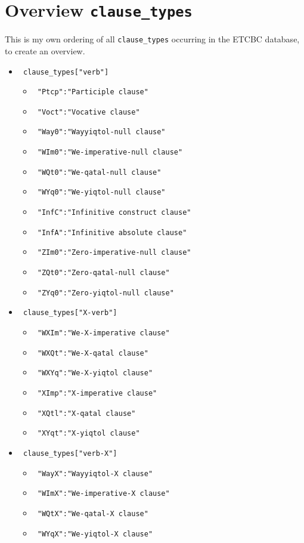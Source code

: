 \documentclass{report}
\newcommand{\mi}[1]{\lstinline{#1}}
\begin{document}
\section{Overview \mi{clause_types}}
This is my own ordering of all \mi{clause_types} occurring in the ETCBC database, to create an overview.

\begin{itemize}
\item \mi{ clause_types["verb"]}
\begin{itemize}
\item \mi{ "Ptcp":"Participle clause"}
\item \mi{ "Voct":"Vocative clause"}
\item \mi{ "Way0":"Wayyiqtol-null clause"}
\item \mi{ "WIm0":"We-imperative-null clause"}
\item \mi{ "WQt0":"We-qatal-null clause"}
\item \mi{ "WYq0":"We-yiqtol-null clause"}
\item \mi{ "InfC":"Infinitive construct clause"}
\item \mi{ "InfA":"Infinitive absolute clause"}
\item \mi{ "ZIm0":"Zero-imperative-null clause"}
\item \mi{ "ZQt0":"Zero-qatal-null clause"}
\item \mi{ "ZYq0":"Zero-yiqtol-null clause"}
\end{itemize}
\item \mi{ clause_types["X-verb"]}
\begin{itemize}
\item \mi{ "WXIm":"We-X-imperative clause"}
\item \mi{ "WXQt":"We-X-qatal clause"}
\item \mi{ "WXYq":"We-X-yiqtol clause"}
\item \mi{ "XImp":"X-imperative clause"}
\item \mi{ "XQtl":"X-qatal clause"}
\item \mi{ "XYqt":"X-yiqtol clause"}
\end{itemize}
\item \mi{ clause_types["verb-X"]}
\begin{itemize}
\item \mi{ "WayX":"Wayyiqtol-X clause"}
\item \mi{ "WImX":"We-imperative-X clause"}
\item \mi{ "WQtX":"We-qatal-X clause"}
\item \mi{ "WYqX":"We-yiqtol-X clause"}

\end{itemize}
\end{itemize}
\end{document}

